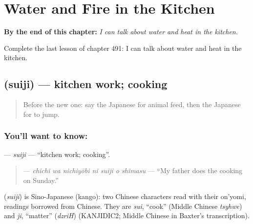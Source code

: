 
\chapter{Water and Fire in the Kitchen}
\label{ch:ja-water-and-fire-in-the-kitchen}

\begin{chapteropening}
\textbf{By the end of this chapter:} \emph{I can talk about water and heat in the kitchen.}

Complete the last lesson of chapter 491: I can talk about water and heat in the kitchen.
\end{chapteropening}

\section[\texorpdfstring{\ja{すいじ} (suiji)}{すいじ (suiji)}]{ (suiji) — kitchen work; cooking}

\label{lesson:JA-C491-suiji}



\begin{quote}
Before the new one: say the Japanese for animal feed, then the Japanese for to jump.
\end{quote}

\subsection*{You'll want to know: }
\textbf{} — \emph{suiji} — \textquotedblleft{}kitchen work; cooking\textquotedblright{}.

\begin{quote}
\textbf{   } — \emph{chichi wa nichiyōbi ni suiji o shimasu} — \textquotedblleft{}My father does the cooking on Sunday.\textquotedblright{}
\end{quote}

\begin{cousinweb}
\textbf{} (\emph{suiji}) is Sino-Japanese (kango): two Chinese characters read with their on'yomi, readings borrowed from Chinese. They are \emph{sui}, \textquotedblleft{}cook\textquotedblright{} (Middle Chinese \emph{tsyhwe}) and \emph{ji}, \textquotedblleft{}matter\textquotedblright{} (\emph{dzriH}) (KANJIDIC2; Middle Chinese in Baxter's transcription).
\end{cousinweb}


